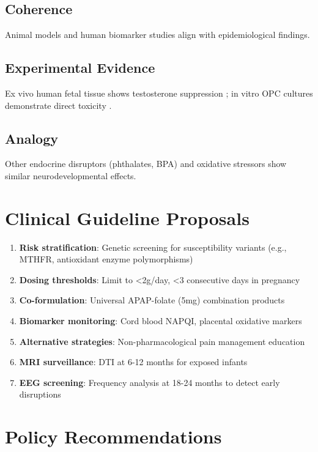 \documentclass[12pt]{article}
\begin{document}
\subsection{Coherence}
Animal models \citep{viberg2014,blecharz2018,philippot2022} and human biomarker studies \citep{ji2020,baker2020} align with epidemiological findings.

\subsection{Experimental Evidence}
Ex vivo human fetal tissue shows testosterone suppression \citep{kristensen2016}; in vitro OPC cultures demonstrate direct toxicity \citep{perez2012}.

\subsection{Analogy}
Other endocrine disruptors (phthalates, BPA) and oxidative stressors show similar neurodevelopmental effects.

\section{Clinical Guideline Proposals}

\begin{enumerate}
\item \textbf{Risk stratification}: Genetic screening for susceptibility variants (e.g., MTHFR, antioxidant enzyme polymorphisms)
\item \textbf{Dosing thresholds}: Limit to <2g/day, <3 consecutive days in pregnancy
\item \textbf{Co-formulation}: Universal APAP-folate (5mg) combination products
\item \textbf{Biomarker monitoring}: Cord blood NAPQI, placental oxidative markers
\item \textbf{Alternative strategies}: Non-pharmacological pain management education
\item \textbf{MRI surveillance}: DTI at 6-12 months for exposed infants
\item \textbf{EEG screening}: Frequency analysis at 18-24 months to detect early disruptions
\end{enumerate}

\section{Policy Recommendations}
\end{document}

